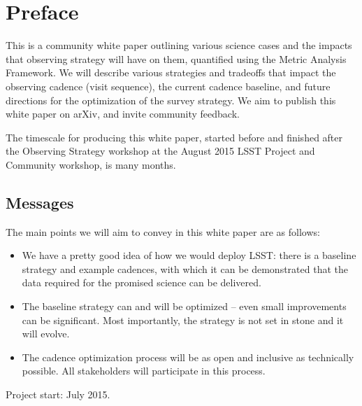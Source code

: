 \setcounter{chapter}{0}
\chapter*{Preface}
\def\chpname{preface}\label{chp:\chpname}
\markboth{}{}

\noindent This is a community white paper outlining various science
cases and the impacts that observing strategy will have on them,
quantified using the Metric Analysis Framework. We will describe
various strategies and tradeoffs that impact the observing cadence
(visit sequence), the current cadence baseline, and future directions
for the optimization of the survey strategy. We aim to publish this
white paper on arXiv, and invite community feedback.

The timescale for producing this white paper, started before and
finished after the Observing Strategy workshop at the  August 2015
LSST Project and Community workshop, is many months.


\section*{Messages}

The main points we will aim to convey in this white paper are as follows:

\begin{itemize}

    \item We have a pretty good idea of how we would deploy LSST:
    there is a baseline strategy and example cadences, with which it
    can be demonstrated that the data required for the promised
    science can be delivered.

    \item The baseline strategy can and will be optimized -- even small
    improvements can be significant. Most importantly, the strategy is
    not set in stone and it will evolve.

    \item The cadence optimization process will be as open and
    inclusive as technically possible. All stakeholders will
    participate in this process.

\end{itemize}

\raggedright{Project start: July 2015.}

